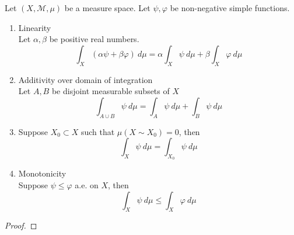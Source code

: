 \begin{theorem}
	Let $(X,\mathcal{M},\mu)$ be a measure space.
	Let $\psi,\varphi$ be non-negative simple functions.
	\begin{enumerate}
		\item Linearity\\
			Let $\alpha, \beta$ be positive real numbers.
			\begin{equation}
				 \int_X (\alpha \psi + \beta \varphi) \ d\mu = \alpha \int_X \psi \ d\mu + \beta \int_X \varphi \ d\mu 
			\end{equation}
		\item Additivity over domain of integration\\
			Let $A,B$ be disjoint measurable subsets of $X$
			\begin{equation}
				\int_{A \cup B} \psi \ d\mu = \int_A \psi \ d\mu + \int_B \psi \ d\mu
			\end{equation}
		\item Suppose $X_0 \subset X$ such that $\mu(X \sim X_0) = 0$, then
			\begin{equation}
				\int_X \psi \ d\mu = \int_{X_0} \psi \ d\mu
			\end{equation}
		\item Monotonicity \\
			Suppose $\psi \le \varphi$ a.e. on $X$, then
			\begin{equation}
				\int_X \psi \ d\mu \le \int_X \varphi \ d\mu
			\end{equation}
	\end{enumerate}
\end{theorem}
\begin{proof}
\end{proof}


